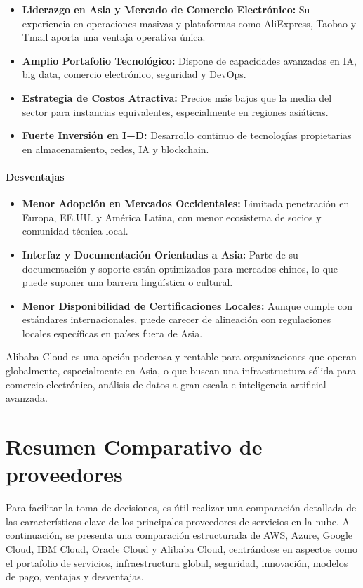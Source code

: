 {                \begin{itemize}
                    \item \textbf{Liderazgo en Asia y Mercado de Comercio Electrónico:} Su experiencia en operaciones masivas y plataformas como AliExpress, Taobao y Tmall aporta una ventaja operativa única.
                    \item \textbf{Amplio Portafolio Tecnológico:} Dispone de capacidades avanzadas en IA, big data, comercio electrónico, seguridad y DevOps.
                    \item \textbf{Estrategia de Costos Atractiva:} Precios más bajos que la media del sector para instancias equivalentes, especialmente en regiones asiáticas.
                    \item \textbf{Fuerte Inversión en I+D:} Desarrollo continuo de tecnologías propietarias en almacenamiento, redes, IA y blockchain.
                \end{itemize}
                
                \paragraph{Desventajas}
                
                \begin{itemize}
                    \item \textbf{Menor Adopción en Mercados Occidentales:} Limitada penetración en Europa, EE.UU. y América Latina, con menor ecosistema de socios y comunidad técnica local.
                    \item \textbf{Interfaz y Documentación Orientadas a Asia:} Parte de su documentación y soporte están optimizados para mercados chinos, lo que puede suponer una barrera lingüística o cultural.
                    \item \textbf{Menor Disponibilidad de Certificaciones Locales:} Aunque cumple con estándares internacionales, puede carecer de alineación con regulaciones locales específicas en países fuera de Asia.
                \end{itemize}
                
                Alibaba Cloud es una opción poderosa y rentable para organizaciones que operan globalmente, especialmente en Asia, o que buscan una infraestructura sólida para comercio electrónico, análisis de datos a gran escala e inteligencia artificial avanzada.
                
    \section{Resumen Comparativo de proveedores}
            Para facilitar la toma de decisiones, es útil realizar una comparación detallada de las características clave de los principales proveedores de servicios en la nube. A continuación, se presenta una comparación estructurada de AWS, Azure, Google Cloud, IBM Cloud, Oracle Cloud y Alibaba Cloud, centrándose en aspectos como el portafolio de servicios, infraestructura global, seguridad, innovación, modelos de pago, ventajas y desventajas.

}
